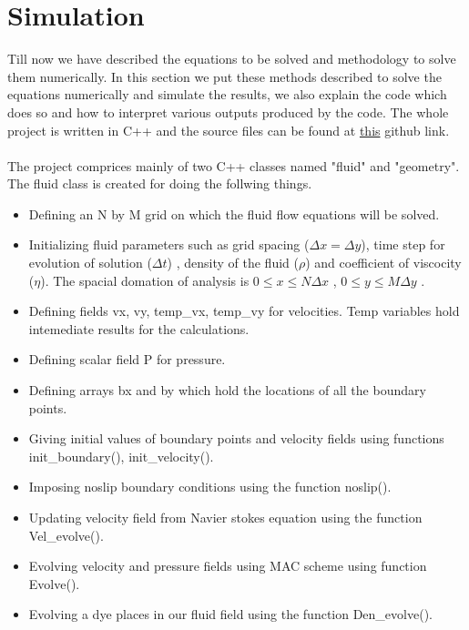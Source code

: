\documentclass{article}		%
\begin{document}
\newpage

\section{Simulation}

Till now we have described the equations to be solved and methodology to solve them numerically. In this section we put these methods described to solve the equations numerically and simulate the results, we also explain the code which does so and how to interpret various outputs produced by the code. The whole project is written in C++ and the source files can be found at \href{https://github.com/ShubhamRaghuvanshi/Fluid_simulation}{this} github link. 
\\\\
The project comprices mainly of  two C++ classes named "fluid" and "geometry". The fluid class is created for doing the follwing things.

\begin{itemize}
	\item Defining an N by M grid on which the fluid flow equations will be solved.
	\item Initializing fluid parameters such as grid spacing ($\Delta x = \Delta y$), time step for evolution of solution ($\Delta t$) , density of the fluid ($\rho$) and coefficient of viscocity ($\eta$). The spacial domation of analysis is $0 \le x \le N \Delta x$ ,  $0 \le y \le M \Delta y$ . 
	\item Defining fields vx, vy, temp\_vx, temp\_vy for velocities. Temp variables hold intemediate results for the calculations. 
	\item Defining scalar field P for pressure. 
	\item Defining arrays bx and by which hold the locations of all the boundary points.
	\item Giving initial values of boundary points and velocity fields using functions init\_boundary(), init\_velocity(). 
	\item Imposing noslip boundary conditions using the function noslip().
	\item Updating velocity field from Navier stokes equation using the function Vel\_evolve().
	\item Evolving velocity and pressure fields using MAC scheme using function Evolve(). 
	\item Evolving a dye places in our fluid field using the function Den\_evolve().
\end{itemize}
\end{document}
